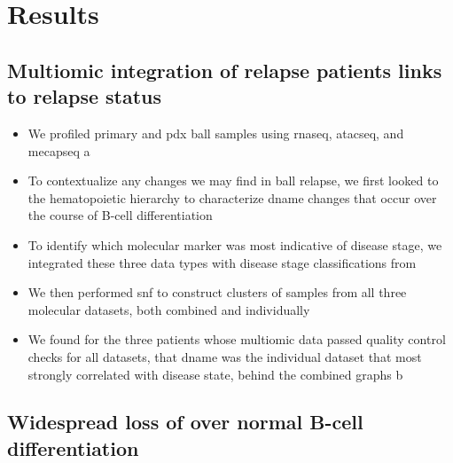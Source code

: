\section{Results}

\subsection{Multiomic integration of  relapse patients links  to relapse status}

\begin{itemize}
  \item We profiled primary and \gls{pdx} \gls{ball} samples using \gls{rnaseq}, \gls{atacseq}, and \gls{mecapseq} a
  \item To contextualize any changes we may find in \gls{ball} relapse, we first looked to the hematopoietic hierarchy to characterize \gls{dname} changes that occur over the course of B-cell differentiation
  \item To identify which molecular marker was most indicative of disease stage, we integrated these three data types with disease stage classifications from \cite[REF][]{dobinSTARUltrafastUniversal2013}
  \item We then performed \gls{snf} to construct clusters of samples from all three molecular datasets, both combined and individually
  \item We found for the three patients whose multiomic data passed quality control checks for all datasets, that \gls{dname} was the individual dataset that most strongly correlated with disease state, behind the combined graphs b
\end{itemize}


\subsection{Widespread loss of  over normal B-cell differentiation}

